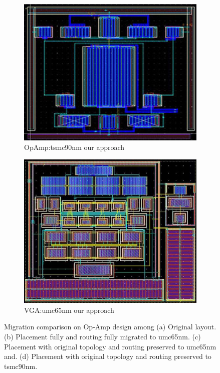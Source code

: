 \begin{figure}[ht]
\begin{subfigure}[t]{0.4\textwidth}
          \includegraphics[width=\textwidth]{Fig/PPL_OPT90.eps}
          \caption{OpAmp:tsmc90nm our approach}\label{fig:PPL_OPT90}
          \end{subfigure}
          \begin{subfigure}[t]{0.4\textwidth}
          \includegraphics[width=\textwidth]{Fig/PPL_VGAU65.eps}
          \caption{VGA:umc65nm our approach}\label{fig:PPL_VGAU65}
          \end{subfigure}
        \caption{Migration comparison on Op-Amp design among (a) Original layout. (b) Placement fully and routing fully migrated to umc65nm. (c) Placement with original topology and routing preserved to umc65nm and. (d) Placement with original topology and routing preserved to tsmc90nm.}\label{fig:Layout}
      \end{figure}



